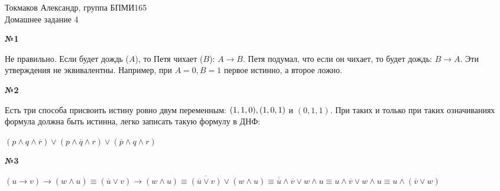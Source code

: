 \documentclass{article}
\newenvironment{task}{\begin{center}\fontsize{14}{14}\selectfont\bf}{\rm\fontsize{12}{12}\selectfont\end{center}}
\begin{document}
	\begin{center}
		Токмаков Александр, группа БПМИ165 \\
		Домашнее задание 4
	\end{center}

	
	\begin{task} 
		№1
	\end{task}
	Не правильно. Если будет дождь ($A$), то Петя чихает ($B$): $A \rightarrow B$. Петя подумал, что если он чихает, то будет дождь: $B \rightarrow A$. Эти утверждения не эквивалентны. Например, при $A = 0, B = 1$ первое истинно, а второе ложно.
	
	

	
		
	\begin{task} 
		№2
	\end{task}
	Есть три способа присвоить истину ровно двум переменным: $(1, 1, 0), \space (1, 0, 1)$ и $(0, 1, 1)$. При таких и только при таких означиваниях формула должна быть истинна, легко записать такую формулу в ДНФ:
	\begin{center}
		$(p \wedge q \wedge \overline{r})\vee(p \wedge \overline{q} \wedge r)\vee(\overline{p} \wedge q \wedge r)$
	\end{center}
	
	
	
	
	
	\begin{task} 
		№3
	\end{task}
	\begin{center}
		$(u \rightarrow v) \rightarrow (w \wedge u) \equiv (\overline{u} \vee v) \rightarrow (w \wedge u) \equiv 
		 \overline{(\overline{u} \vee v)} \vee (w \wedge u) \equiv 
		 \overline{\overline{u}} \wedge \overline{v} \vee w \wedge u \equiv 
		 u \wedge \overline{v} \vee w \wedge u \equiv 
		 u \wedge (\overline{v} \vee w)$
	\end{center}
	
	
	
\end{document}
